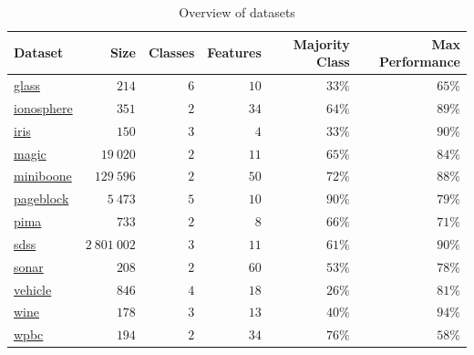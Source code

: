 \documentclass[fleqn,10pt,lineno]{wlpeerj} %
\begin{document}
\begin{table}[htbp]
	\caption {Overview of datasets} \label{tab:datasets}
	\centering
	\begin{tabular}{lrrrrr}
		\toprule
		{Dataset}  & Size &  Classes & Features & Majority Class & Max Performance \\
		\midrule
        \href{https://archive.ics.uci.edu/ml/datasets/Glass+Identification}{glass}
        	& $214$ & $6$ & $10$ & $33\%$ & $65\%$ \\
		\href{https://archive.ics.uci.edu/ml/datasets/Ionosphere}{ionosphere}
			& $351$ & $2$ & $34$ & $64\%$ & $89\%$ \\
		\href{https://archive.ics.uci.edu/ml/datasets/Iris}{iris}
        	& $150$ & $3$ & $4$ & $33\%$ & $90\%$ \\
        \href{https://archive.ics.uci.edu/ml/datasets/MAGIC+Gamma+Telescope}{magic}
        	& $19~020$ & $2$ & $11$ & $65\%$ & $84\%$ \\
        \href{https://archive.ics.uci.edu/ml/datasets/MiniBooNE+particle+identification}{miniboone}
        	& $129~596$ & $2$ & $50$ & $72\%$ & $88\%$ \\
        \href{https://archive.ics.uci.edu/ml/datasets/Page+Blocks+Classification}{pageblock}
        	& $5~473$ & $5$ & $10$ & $90\%$ & $79\%$ \\
		\href{https://archive.ics.uci.edu/ml/datasets/Pima+Indians+Diabetes}{pima}
        	& $733$ & $2$ & $8$ & $66\%$ & $71\%$ \\
        \href{http://dx.doi.org/10.5281/zenodo.58500}{sdss}
        	& $2~801~002$ & $3$ & $11$ & $61\%$ & $90\%$ \\
		\href{https://archive.ics.uci.edu/ml/datasets/Connectionist+Bench+(Sonar,+Mines+vs.+Rocks)}{sonar}
        	& $208$ & $2$ & $60$ & $53\%$ & $78\%$ \\
        \href{https://archive.ics.uci.edu/ml/datasets/Statlog+(Vehicle+Silhouettes)}{vehicle}
			& $846$ & $4$ & $18$ & $26\%$ & $81\%$ \\
		\href{https://archive.ics.uci.edu/ml/datasets/Wine}{wine}
        	& $178$ & $3$ & $13$ & $40\%$ & $94\%$ \\
		\href{https://archive.ics.uci.edu/ml/datasets/Breast+Cancer+Wisconsin+(Prognostic)}{wpbc}
        	& $194$ & $2$ & $34$ & $76\%$ & $58\%$ \\
		\bottomrule
	\end{tabular}
\end{table}
\end{document}
